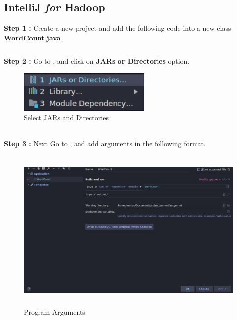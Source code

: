 \documentclass[10pt]{report}
\begin{document}
\subsection{IntelliJ \textit{for} Hadoop}
\vspace{0.5cm}
\textbf{Step 1 :} Create a new project and add the following code into a new class \textbf{WordCount.java}.\\

\inputminted[frame=lines]{java}{src/WordCount.java}

\textbf{Step 2 :} Go to , and click on \textbf{JARs or Directories} option.
\begin{figure}[h]
        \includegraphics[height=2cm]{JAR.png}
        \centering
        \caption{Select JARs and Directories}
        \centering
\end{figure}
\\

\label{step3}\textbf{Step 3 :} Next Go to , and add arguments in the following format.
\begin{figure}[h]
        \includegraphics[height=8cm]{arguments.png}
        \centering
        \caption{Program Arguments}
        \centering
\end{figure}
\clearpage
\end{document}
